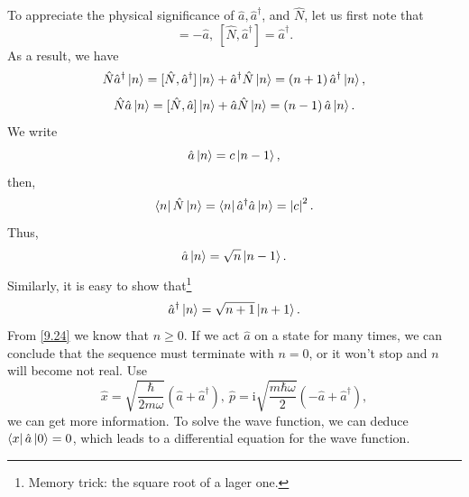 \documentclass{article}
\theoremstyle{1}
\newcommand{\ii}{\mathrm{i}}
\begin{document}
To appreciate the physical significance of $\hat{a},\hat{a}^\dagger$, and $\hat{N}$, let us first note that 
\begin{equation}
    [\hat{N},\hat{a}]=-\hat{a},\ [\hat{N},\hat{a}^\dagger]=\hat{a}^\dagger.
\end{equation}
As a result, we have
\begin{equation}
    \hat{N}\hat{a}^\dagger\ket{n}=[\hat{N},\hat{a}^\dagger]\ket{n}+\hat{a}^\dagger\hat{N}\ket{n}=\left(n+1\right)\hat{a}^\dagger\ket{n},
\end{equation}
\begin{equation}
    \hat{N}\hat{a}\ket{n}=[\hat{N},\hat{a}]\ket{n}+\hat{a}\hat{N}\ket{n}=\left(n-1\right)\hat{a}\ket{n}.
\end{equation}
We write
\begin{equation}
    \hat{a}\ket{n}=c\ket{n-1},
\end{equation}
then, 
\begin{equation}\label{9.24}
    \bra{n}\hat{N}\ket{n}=\bra{n}\hat{a}^\dagger\hat{a}\ket{n}=\left|c\right|^2.
\end{equation}
Thus, 
\begin{equation}
    \hat{a}\ket{n}=\sqrt{n}\ket{n-1}.
\end{equation}
Similarly, it is easy to show that\footnote{Memory trick: the square root of a lager one.}
\begin{equation}
    \hat{a}^\dagger\ket{n}=\sqrt{n+1}\ket{n+1}.
\end{equation}
From \eqref{9.24} we know that $n\ge0.$
If we act $\hat{a}$ on a state for many times, we can conclude that the sequence must
terminate with $n=0$, or it won't stop and $n$ will become not real.
Use 
\begin{equation}
    \hat{x}=\sqrt{\frac{\hbar}{2m\omega}}\left(\hat{a}+\hat{a}^\dagger\right),\ \hat{p}=\ii\sqrt{\frac{m\hbar\omega}{2}}\left(-\hat{a}+\hat{a}^\dagger\right),
\end{equation}
we can get more information. To solve the wave function, we can deduce $\bra{x}\hat{a}\ket{0}=0$, which leads to a differential equation for the wave function.
\end{document}
